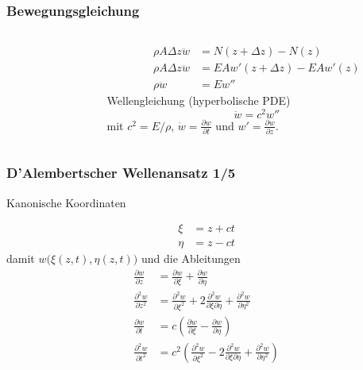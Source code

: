 
\begin{frame}
 \frametitle{Bewegungsgleichung}
 \begin{columns}
        \begin{column}[t]{.5\linewidth}
 
 \end{column}
        \begin{column}[t]{.5\linewidth}
        \vspace{-5cm}
        \begin{align*}
         \rho A \Delta z \ddot{w}&=N(z+\Delta z) - N(z)  \\
         \rho A \Delta z \ddot{w}&=EAw'(z+\Delta z) - EAw'(z)  \\
         \rho \ddot{w}&=Ew''  
        \end{align*}
        Wellengleichung (hyperbolische PDE)
        \begin{equation*}
         \ddot{w}=c^2 w''
        \end{equation*}
        mit $c^2=E/\rho$, $\dot{w}=\frac{\partial w}{\partial t}$ und $w'=\frac{\partial w}{\partial z}$.
        \end{column}
        
 \end{columns}
\end{frame}


\begin{frame}
\frametitle{D'Alembertscher Wellenansatz 1/5}
Kanonische Koordinaten 
\hfill 

\begin{align*}
 \xi &= z+ct \\
 \eta &= z-ct 
\end{align*}
damit $w\bigl( \xi(z,t), \eta(z,t) \bigr)$ und die Ableitungen
\begin{align*}
\frac{\partial w}{\partial z} &= \frac{\partial w}{\partial \xi} + \frac{\partial w}{\partial \eta} \\
\frac{\partial^2 w}{\partial z^2} &= \frac{\partial^2 w}{\partial \xi^2} +
2\frac{\partial^2 w}{\partial \xi \partial \eta} + \frac{\partial^2 w}{\partial \eta^2} \\
\frac{\partial w}{\partial t} &=c\left( \frac{\partial w}{\partial \xi} - \frac{\partial w}{\partial \eta}\right) \\
\frac{\partial^2 w}{\partial t^2} &= c^2\left( \frac{\partial^2 w}{\partial \xi^2} -2\frac{\partial^2 w}{\partial \xi \partial \eta} + \frac{\partial^2 w}{\partial \eta^2}\right)
\end{align*}
\end{frame}

